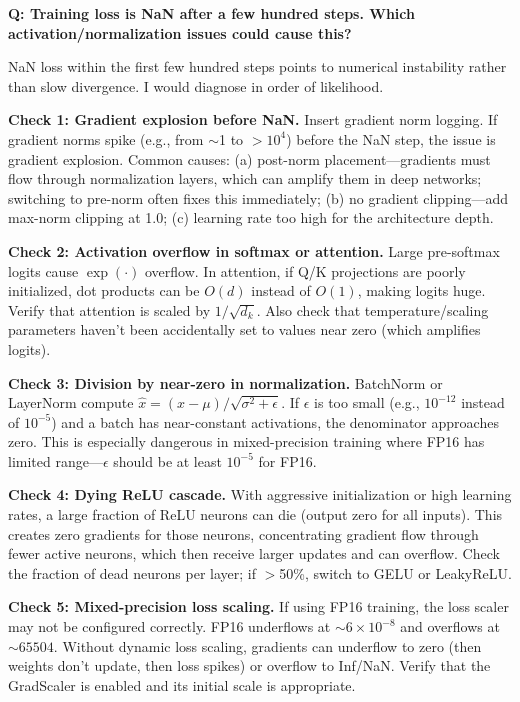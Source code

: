 \begin{interviewq}
\textbf{Q: Training loss is NaN after a few hundred steps. Which activation/normalization issues could cause this?}

 \quad {} \quad \badgefreq{\freqhigh}

\stronganswer

NaN loss within the first few hundred steps points to numerical instability rather than slow divergence. I would diagnose in order of likelihood.

\textbf{Check 1: Gradient explosion before NaN.} Insert gradient norm logging. If gradient norms spike (e.g., from $\sim$1 to $>10^4$) before the NaN step, the issue is gradient explosion. Common causes: (a) post-norm placement---gradients must flow through normalization layers, which can amplify them in deep networks; switching to pre-norm often fixes this immediately; (b) no gradient clipping---add max-norm clipping at 1.0; (c) learning rate too high for the architecture depth.

\textbf{Check 2: Activation overflow in softmax or attention.} Large pre-softmax logits cause $\exp(\cdot)$ overflow. In attention, if Q/K projections are poorly initialized, dot products can be $O(d)$ instead of $O(1)$, making logits huge. Verify that attention is scaled by $1/\sqrt{d_k}$. Also check that temperature/scaling parameters haven't been accidentally set to values near zero (which amplifies logits).

\textbf{Check 3: Division by near-zero in normalization.} BatchNorm or LayerNorm compute $\hat{x} = (x - \mu)/\sqrt{\sigma^2 + \epsilon}$. If $\epsilon$ is too small (e.g., $10^{-12}$ instead of $10^{-5}$) and a batch has near-constant activations, the denominator approaches zero. This is especially dangerous in mixed-precision training where FP16 has limited range---$\epsilon$ should be at least $10^{-5}$ for FP16.

\textbf{Check 4: Dying ReLU cascade.} With aggressive initialization or high learning rates, a large fraction of ReLU neurons can die (output zero for all inputs). This creates zero gradients for those neurons, concentrating gradient flow through fewer active neurons, which then receive larger updates and can overflow. Check the fraction of dead neurons per layer; if $>$50\%, switch to GELU or LeakyReLU.

\textbf{Check 5: Mixed-precision loss scaling.} If using FP16 training, the loss scaler may not be configured correctly. FP16 underflows at $\sim 6 \times 10^{-8}$ and overflows at $\sim 65504$. Without dynamic loss scaling, gradients can underflow to zero (then weights don't update, then loss spikes) or overflow to Inf/NaN. Verify that the GradScaler is enabled and its initial scale is appropriate.


\end{interviewq}
